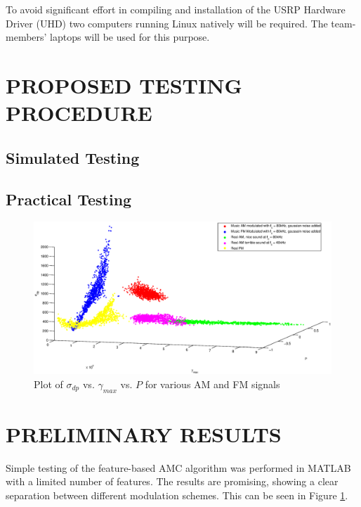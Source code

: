 \documentclass[10pt,twocolumn]{witseiepaper}
\begin{document}
		To avoid significant effort in compiling and installation of the USRP Hardware Driver (UHD) two computers running Linux natively will be required. The team-members' laptops will be used for this purpose.

\section{PROPOSED TESTING PROCEDURE}
	\subsection{Simulated Testing}
	\subsection{Practical Testing}

	\begin{figure}[!h]
		\centering
		\includegraphics[width=1.1\textwidth]{plot0.eps}
		\caption{Plot of $\sigma_{dp}$ vs. $\gamma_{max}$ vs. $P$ for various AM and FM signals}
		\label{fig:plot0}
	\end{figure}

\section{PRELIMINARY RESULTS}
	Simple testing of the feature-based AMC algorithm was performed in MATLAB with a limited number of features. The results are promising, showing a clear separation between different modulation schemes. This can be seen in Figure \ref{fig:plot0}. 
\end{document}
